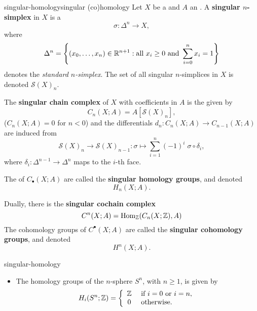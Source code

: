 
\begin{topic}{singular-homology}{singular (co)homology}
    Let $X$ be a  and $A$ an . A \textbf{singular $n$-simplex} in $X$ is a 
    \[ \sigma : \Delta^n \to X , \]
    where 
    \[ \Delta^n = \left\{ (x_0, \ldots, x_n) \in \mathbb{R}^{n + 1} : \text{all } x_i \ge 0 \text{ and } \sum_{i = 0}^n x_i = 1 \right\} \]
    denotes the \textit{standard $n$-simplex}. The set of all singular $n$-simplices in $X$ is denoted $\mathcal{S}(X)_n$.
    
    The \textbf{singular chain complex} of $X$ with coefficients in $A$ is the  given by
    \[ C_n(X; A) = A[\mathcal{S}(X)_n] , \]
    ($C_n(X; A) = 0$ for $n < 0$) and the differentials $d_n : C_n(X; A) \to C_{n - 1}(X; A)$ are induced from
    \[ \mathcal{S}(X)_n \to \mathcal{S}(X)_{n - 1} : \sigma \mapsto \sum_{i = 1}^{n} (-1)^i \; \sigma \circ \delta_i , \]
    where $\delta_i : \Delta^{n - 1} \to \Delta^n$ maps to the $i$-th face.
    
    The  of $C_\bullet(X; A)$ are called the \textbf{singular homology groups}, and denoted
    \[ H_n(X; A) . \]
    
    Dually, there is the \textbf{singular cochain complex}
    \[ C^n(X; A) = \operatorname{Hom}_{\mathbb{Z}}(C_n(X; \mathbb{Z}), A) \]
    The cohomology groups of $C^\bullet(X; A)$ are called the \textbf{singular cohomology groups}, and denoted
    \[ H^n(X; A) . \]
\end{topic}

\begin{example}{singular-homology}
    \begin{itemize}
        \item The homology groups of the $n$-sphere $S^n$, with $n \ge 1$, is given by
        \[ H_i(S^n; \mathbb{Z}) = \left\{ \begin{array}{cl} \mathbb{Z} & \textup{ if } i = 0 \textup{ or } i = n , \\ 0 & \textup{ otherwise}. \end{array} \right. \]
    \end{itemize}
\end{example}

